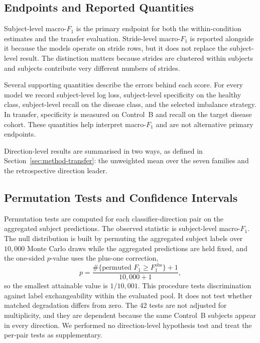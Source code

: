\documentclass[conference]{IEEEtran}
\begin{document}
\subsection{Endpoints and Reported Quantities}
Subject-level macro-$F_1$ is the primary endpoint for both the within-condition estimates and the transfer evaluation. Stride-level macro-$F_1$ is reported alongside it because the models operate on stride rows, but it does not replace the subject-level result. The distinction matters because strides are clustered within subjects and subjects contribute very different numbers of strides.

Several supporting quantities describe the errors behind each score. For every model we record subject-level log loss, subject-level specificity on the healthy class, subject-level recall on the disease class, and the selected imbalance strategy. In transfer, specificity is measured on Control~B and recall on the target disease cohort. These quantities help interpret macro-$F_1$ and are not alternative primary endpoints.

Direction-level results are summarised in two ways, as defined in Section~\ref{sec:method-transfer}: the unweighted mean over the seven families and the retrospective direction leader.

\subsection{Permutation Tests and Confidence Intervals}
\label{sec:setup-inference}
Permutation tests are computed for each classifier-direction pair on the aggregated subject predictions. The observed statistic is subject-level macro-$F_1$. The null distribution is built by permuting the aggregated subject labels over $10{,}000$ Monte Carlo draws while the aggregated predictions are held fixed, and the one-sided $p$-value uses the plus-one correction,
\begin{equation}
p = \frac{\#\{\text{permuted } F_1 \ge F_1^{\mathrm{obs}}\} + 1}{10{,}000 + 1},
\end{equation}
so the smallest attainable value is $1/10{,}001$. This procedure tests discrimination against label exchangeability within the evaluated pool. It does not test whether matched degradation differs from zero. The 42 tests are not adjusted for multiplicity, and they are dependent because the same Control~B subjects appear in every direction. We performed no direction-level hypothesis test and treat the per-pair tests as supplementary.
\end{document}
